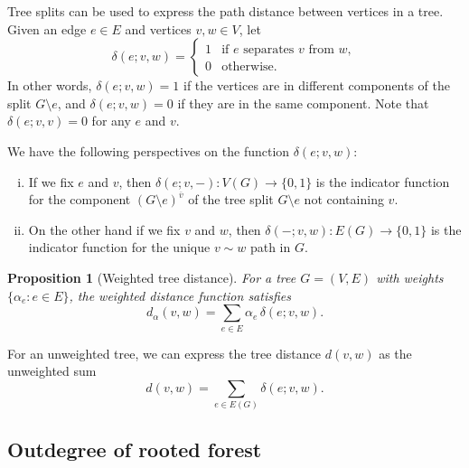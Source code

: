 \documentclass{amsart}
\newtheorem{prop}[thm]{Proposition}
\theoremstyle{definition}
\begin{document}
Tree splits can be used to express the path distance between vertices in a tree.
Given an edge $e\in E$ and vertices $v,w \in V$, let 
\begin{equation}
\delta(e;v,w) = \begin{cases}
	1 &\text{if $e$ separates  $v$ from $w$}, \\
	0 &\text{otherwise}.
\end{cases}
\end{equation}
In other words, $\delta(e; v,w) = 1$ if the vertices are in different components of the split $G \setminus e$,
and $\delta(e; v,w) = 0$ if they are in the same component.
Note that $\delta(e; v,v) = 0$ for any $e$ and $v$.

We have the following perspectives on the function $\delta(e; v,w)$:
\begin{enumerate}[(i)]
\item 
If we fix $e$ and $v$,
then $\delta(e;v, -) : V(G) \to \{0,1\}$ 
is the indicator function for the component 
$(G \setminus e)^{\overline v}$ of the tree split $G \setminus e$
not containing $v$.

\item 
On the other hand if we fix $v$ and $w$, then $\delta(-;v,w) : E(G) \to \{0,1\}$
is the indicator function for the unique $v \sim w$ path in $G$.

\end{enumerate}


\begin{prop}[Weighted tree distance]
\label{prop:distance-sum}
For a tree $G = (V,E)$ with weights $\{\alpha_e : e \in E\}$,
the weighted distance function satisfies
\[ d_\alpha(v,w) = \sum_{e \in E} \alpha_e \, \delta(e; v,w) .\]
\end{prop}

For an unweighted tree, we can express the tree distance $d(v,w)$ as the unweighted sum
\begin{equation*}
	d(v,w) = \sum_{e \in E(G)} \delta(e; v,w).
\end{equation*}


\subsection{Outdegree of rooted forest}
\end{document}
